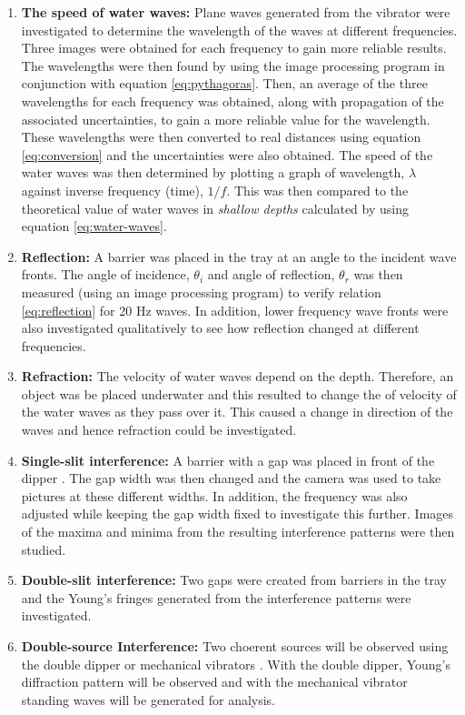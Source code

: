 \documentclass{article}
\begin{document}
\begin{enumerate}
  \item \textbf{The speed of water waves:} Plane waves generated from the vibrator were investigated to determine the wavelength of the waves at different frequencies. Three images were obtained for each frequency to gain more reliable results. The wavelengths were then found by using the image processing program in conjunction with equation \eqref{eq:pythagoras}. Then, an average of the three wavelengths for each frequency was obtained, along with propagation of the associated uncertainties, to gain a more reliable value for the wavelength. These wavelengths were then converted to real distances using equation \eqref{eq:conversion} and the uncertainties were also obtained. The speed of the water waves was then determined by plotting a graph of wavelength, $\lambda$ against inverse frequency (time), $1/f$. This was then compared to the theoretical value of water waves in \textit{shallow depths} calculated by using equation \eqref{eq:water-waves}. 
  \item \textbf{Reflection:} A barrier was placed in the tray at an angle to the incident wave fronts. The angle of incidence, $\theta_i$ and angle of reflection, $\theta_r$ was then measured (using an image processing program) to verify relation \eqref{eq:reflection} for 20 Hz waves. In addition, lower frequency wave fronts were also investigated qualitatively to see how reflection changed at different frequencies.
  \item \textbf{Refraction:} The velocity of water waves depend on the depth. Therefore, an object was be placed underwater and this resulted to change the of velocity of the water waves as they pass over it. This caused a change in direction of the waves and hence refraction could be investigated.
  \item \textbf{Single-slit interference:} A barrier with a gap was placed in front of the dipper \cite{Paper01}. The gap width was then changed and the camera was used to take pictures at these different widths. In addition, the frequency was also adjusted while keeping the gap width fixed to investigate this further. Images of the maxima and minima from the resulting interference patterns were then studied.
  \item \textbf{Double-slit interference:} Two gaps were created from barriers in the tray and the Young's fringes generated from the interference patterns were investigated. 
  \item \textbf{Double-source Interference:} Two choerent sources will be observed using the double dipper or mechanical vibrators \cite{Paper01}. With the double dipper, Young's diffraction pattern will be observed and with the mechanical vibrator standing waves will be generated for analysis.

\end{enumerate}
\end{document}
